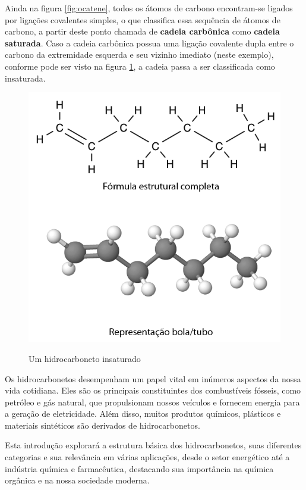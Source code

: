 \documentclass[a4paper,12pt]{book}
\begin{document}
Ainda na figura \ref{fig:ocatene}, todos os átomos de carbono encontram-se ligados por ligações covalentes simples, o que classifica essa sequência de átomos de carbono, a partir deste ponto chamada de \textbf{cadeia carbônica} como \textbf{cadeia saturada}. Caso a cadeia carbônica possua uma ligação covalente dupla entre o carbono da extremidade esquerda e seu vizinho imediato (neste exemplo), conforme pode ser visto na figura \ref{fig:hexene}, a cadeia passa a ser classificada como insaturada.

\begin{figure}[h]\centering
\caption{Um hidrocarboneto insaturado}
\includegraphics[scale=0.5]{imagens/hexeno.png}
\label{fig:hexene}\vspace{0.5cm}\end{figure}

Os hidrocarbonetos desempenham um papel vital em inúmeros aspectos da nossa vida cotidiana. Eles são os principais constituintes dos combustíveis fósseis, como petróleo e gás natural, que propulsionam nossos veículos e fornecem energia para a geração de eletricidade. Além disso, muitos produtos químicos, plásticos e materiais sintéticos são derivados de hidrocarbonetos.

Esta introdução explorará a estrutura básica dos hidrocarbonetos, suas diferentes categorias e sua relevância em várias aplicações, desde o setor energético até a indústria química e farmacêutica, destacando sua importância na química orgânica e na nossa sociedade moderna.
\end{document}
